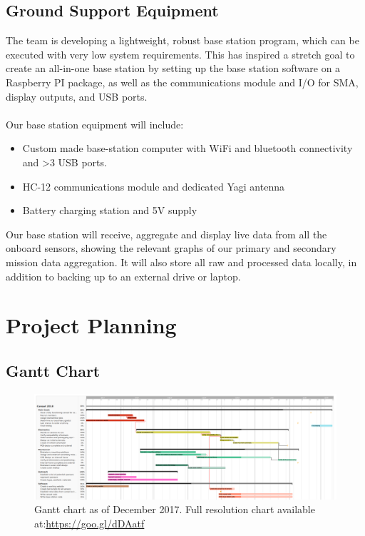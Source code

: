 \documentclass{report}
\begin{document}
	\section{Ground Support Equipment}
		The team is developing a lightweight, robust base station program, which 
		can be executed with very low system requirements. This has inspired a
		stretch goal to create an all-in-one base station by setting up the base 
		station software on a Raspberry PI package, as well as the communications
		module and I/O for SMA, display outputs, and USB ports.
		\\\\
		Our base station equipment will include:
		\begin{itemize}
			\item Custom made base-station computer with WiFi and bluetooth
			connectivity and >3 USB ports.
			\item HC-12 communications module and dedicated Yagi antenna
			\item Battery charging station and 5V supply
		\end{itemize}
		Our base station will receive, aggregate and display live data
		from all the onboard sensors, showing the relevant graphs of our primary
		and secondary mission data aggregation. It will also store all raw and 
		processed data locally, in addition to backing up to an external drive or 
		laptop.
	

\chapter{Project Planning}
	\section{Gantt Chart}
	\begin{figure}[h]
		\centering
		\includegraphics[width=\textwidth]{ganttDec.PNG}
		\caption{Gantt chart as of December 2017. Full resolution chart 
		available at:\url{https://goo.gl/dDAatf}}
	\end{figure}
	
\end{document}
